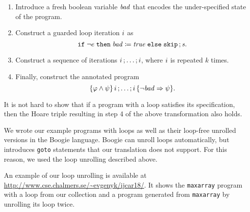 \begin{enumerate}
  \item Introduce a fresh boolean variable $\mathit{bad}$ that encodes the under-specified state of the program.
  \item Construct a guarded loop iteration $i$ as $${\mathtt{if}\;{\neg e}\;\allowbreak\mathtt{then}\;{{\mathit{bad}}\coloneqq{\mathit{true}}}\;\allowbreak\mathtt{else}\;{\mathtt{skip}}}\,;{\mathit{s}}.$$
  \item Construct a sequence of iterations ${{i}\,;{\ldots}}\,;{i}$, where $i$ is repeated $k$ times. 
  \item Finally, construct the annotated program $$\{{\varphi \wedge \psi}\}\,{{{i}\,;{\ldots}}\,;{i}}\,\{{\neg\mathit{bad} \Rightarrow \psi}\}.$$
\end{enumerate}

It is not hard to show that if a program with a loop satisfies its specification, then the Hoare triple resulting in step 4 of the above transformation also holds. 

We wrote our example programs with loops as well as their loop-free unrolled versions in the Boogie language. Boogie can unroll loops automatically, but introduces \verb'goto' statements that our translation does not support. For this reason, we used the loop unrolling described above. 


An example of our loop unrolling is available at \url{http://www.cse.chalmers.se/~evgenyk/ijcar18/}. It shows the \texttt{maxarray} program with a loop from our collection and a program generated from \texttt{maxarray} by unrolling its loop twice.


